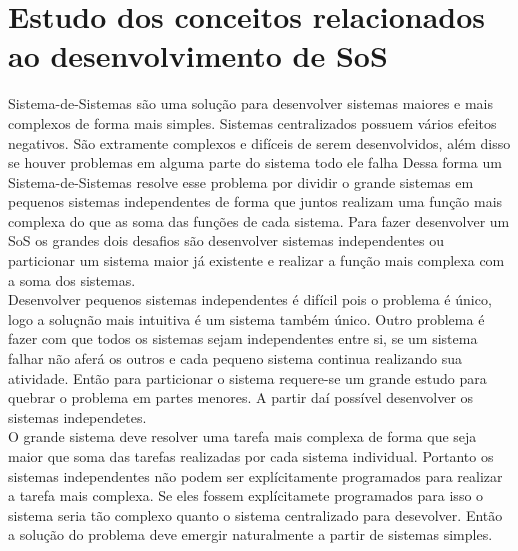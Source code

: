 \documentclass[12pt]{report}
\begin{document}
\section{Estudo dos conceitos relacionados ao desenvolvimento de SoS}
Sistema-de-Sistemas são uma solução para desenvolver sistemas maiores e mais complexos de forma mais simples. Sistemas centralizados possuem vários efeitos negativos. São extramente complexos e difíceis de serem desenvolvidos, além disso se houver problemas em alguma parte do sistema todo ele falha Dessa forma um Sistema-de-Sistemas resolve esse problema por dividir o grande sistemas em pequenos sistemas independentes de forma que juntos realizam uma função mais complexa do que as soma das funções de cada sistema. Para fazer desenvolver um SoS os grandes dois desafios são desenvolver sistemas independentes ou particionar um sistema maior já existente e realizar a função mais complexa com a soma dos sistemas.\\
Desenvolver pequenos sistemas independentes é difícil pois o problema é único, logo a soluçnão mais intuitiva é um sistema também único. Outro problema é fazer com que todos os sistemas sejam independentes entre si, se um sistema falhar não aferá os outros e cada pequeno sistema continua realizando sua atividade. Então para particionar o sistema requere-se um grande estudo para quebrar o problema em partes menores. A partir daí possível desenvolver os sistemas independetes.\\
O grande sistema deve resolver uma tarefa mais complexa de forma que seja maior que soma das tarefas realizadas por cada sistema individual. Portanto os sistemas independentes não podem ser explícitamente programados para realizar a tarefa mais complexa. Se eles fossem explícitamete programados para isso o sistema seria tão complexo quanto o sistema centralizado para desevolver. Então a solução do problema deve emergir naturalmente a partir de sistemas simples.\\
\end{document}
